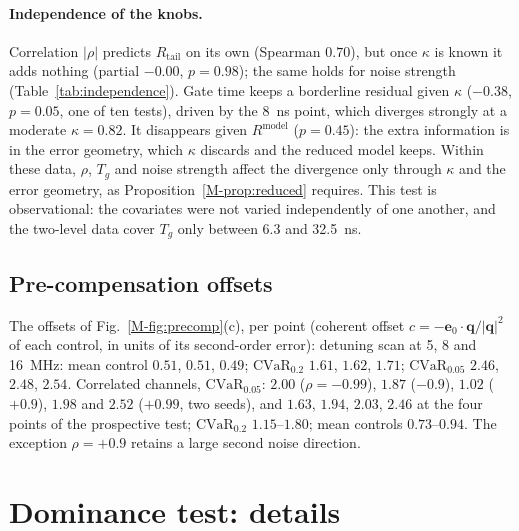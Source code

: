 \documentclass[aps,pra,onecolumn,notitlepage,superscriptaddress,nofootinbib,floatfix]{revtex4-2}
\newcommand{\cvar}{\mathrm{CVaR}}
\newcommand{\Rt}{R_{\mathrm{tail}}}
\begin{document}
\paragraph{Independence of the knobs.} Correlation $|\rho|$ predicts $\Rt$ on
its own (Spearman $0.70$), but once $\kappa$ is known it adds nothing (partial
$-0.00$, $p=0.98$); the same holds for noise strength
(Table~\ref{tab:independence}). Gate time keeps a borderline residual given
$\kappa$ ($-0.38$, $p=0.05$, one of ten tests), driven by the 8~ns point, which
diverges strongly at a moderate $\kappa=0.82$. It disappears given
$R^{\mathrm{model}}$ ($p=0.45$): the extra information is in the error
geometry, which $\kappa$ discards and the reduced model keeps. Within these data, $\rho$, $T_g$ and noise strength
affect the divergence only through $\kappa$ and the error geometry, as
Proposition~\ref{M-prop:reduced} requires. This test is observational: the
covariates were not varied independently of one another, and the two-level
data cover $T_g$ only between 6.3 and 32.5~ns.


\subsection{Pre-compensation offsets}

The offsets of Fig.~\ref{M-fig:precomp}(c), per point (coherent offset
$c=-\mathbf e_0\cdot\mathbf q/|\mathbf q|^2$ of each control, in units of its
second-order error): detuning scan at 5, 8 and 16~MHz: mean control
$0.51$, $0.51$, $0.49$; $\cvar_{0.2}$ $1.61$, $1.62$, $1.71$;
$\cvar_{0.05}$ $2.46$, $2.48$, $2.54$. Correlated channels, $\cvar_{0.05}$:
$2.00$ ($\rho=-0.99$), $1.87$ ($-0.9$), $1.02$ ($+0.9$), $1.98$ and $2.52$
($+0.99$, two seeds), and $1.63$, $1.94$, $2.03$, $2.46$ at the four points of
the prospective test; $\cvar_{0.2}$ $1.15$--$1.80$; mean controls
$0.73$--$0.94$. The exception $\rho=+0.9$ retains a large second noise
direction.

\section{Dominance test: details}
\label{sec:dominancedetails}
\end{document}
